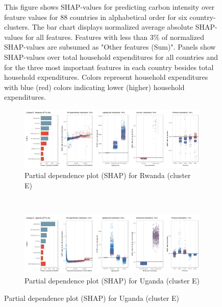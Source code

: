 \begin{figure}[ht!]
    \begin{subcaption2}
     This figure shows SHAP-values for predicting carbon intensity over feature values for 88 countries in alphabetical order for six country-clusters. The bar chart displays normalized average absolute SHAP-values for all features. Features with less than 3\% of normalized SHAP-values are subsumed as "Other features (Sum)". Panels show SHAP-values over total household expenditures for all countries and for the three most important features in each country besides total household expenditures. Colors represent household expenditures with blue (red) colors indicating lower (higher) household expenditures.
     \end{subcaption2}
\end{figure}


\begin{figure}[ht!]\ContinuedFloat
    \centering
   \begin{subfigure}[b]{\textwidth}
    \centering
         \caption{Partial dependence plot (SHAP) for Rwanda (cluster E)}
         \label{fig:5b_RWA}
         \includegraphics[width=\textwidth]{Figure 5b/Figure_5b_RWA}
         \end{subfigure}
    \\
    \vspace{0.5cm}
    \begin{subfigure}[b]{\textwidth}
     \centering
         \caption{Partial dependence plot (SHAP) for Uganda (cluster E)}
         \label{fig:5b_UGA}
         \includegraphics[width=\textwidth]{Figure 5b/Figure_5b_UGA}        
     \end{subfigure}

\end{figure}
